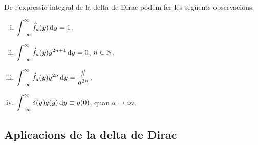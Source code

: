 De l'expressió integral de la delta de Dirac podem fer les següents observacions:
\begin{enumerate}[i)]
    \item $\displaystyle \int_{-\infty}^{\infty} \hat{f}_{a}(y) \mathop{}\!\mathrm{d} y = 1$.
    \item $\displaystyle \int_{-\infty}^{\infty} \hat{f}_{a}(y) y^{2n+1} \mathop{}\!\mathrm{d} y = 0$, $n \in \mathbb{N}$.
    \item $\displaystyle \int_{-\infty}^{\infty} \hat{f}_{a}(y) y^{2n} \mathop{}\!\mathrm{d} y = \frac{\#}{a^{2n}}$.
    \item $\displaystyle \int_{-\infty}^{\infty} \delta(y) g(y) \mathop{}\!\mathrm{d} y \equiv g(0)$, quan $a \to \infty$.
\end{enumerate}

\subsection{Aplicacions de la delta de Dirac}
